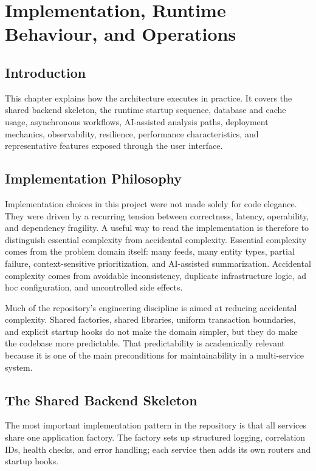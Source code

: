 \chapter{Implementation, Runtime Behaviour, and Operations}
\thispagestyle{plain}
\section*{Introduction}
This chapter explains how the architecture executes in practice. It covers the shared backend skeleton, the runtime startup sequence, database and cache usage, asynchronous workflows, AI-assisted analysis paths, deployment mechanics, observability, resilience, performance characteristics, and representative features exposed through the user interface.

\section{Implementation Philosophy}
Implementation choices in this project were not made solely for code elegance. They were driven by a recurring tension between correctness, latency, operability, and dependency fragility. A useful way to read the implementation is therefore to distinguish essential complexity from accidental complexity. Essential complexity comes from the problem domain itself: many feeds, many entity types, partial failure, context-sensitive prioritization, and AI-assisted summarization. Accidental complexity comes from avoidable inconsistency, duplicate infrastructure logic, ad hoc configuration, and uncontrolled side effects.

Much of the repository's engineering discipline is aimed at reducing accidental complexity. Shared factories, shared libraries, uniform transaction boundaries, and explicit startup hooks do not make the domain simpler, but they do make the codebase more predictable. That predictability is academically relevant because it is one of the main preconditions for maintainability in a multi-service system.

\section{The Shared Backend Skeleton}
The most important implementation pattern in the repository is that all services share one application factory. The factory sets up structured logging, correlation IDs, health checks, and error handling; each service then adds its own routers and startup hooks.

